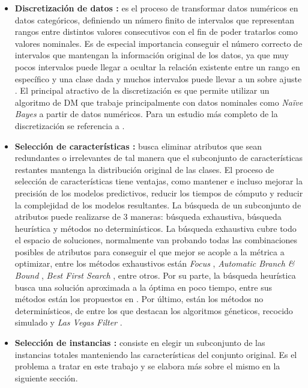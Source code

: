 \begin{itemize}
\item \textbf{Discretización de datos \cite{garcia2016data,garcia2013survey}:}
es el proceso de transformar datos numéricos en datos categóricos, definiendo un número finito de intervalos que representan rangos entre distintos valores consecutivos con el fin de poder tratarlos como valores nominales. Es de especial importancia conseguir el número correcto de intervalos que mantengan la información original de los datos, ya que muy pocos intervalos puede llegar a ocultar la relación existente entre un rango en específico y una clase dada y muchos intervalos puede llevar a un sobre ajuste \cite{cios2007data}. El principal atractivo de la discretización es que permite utilizar un algoritmo de DM que trabaje principalmente con datos nominales como \emph{Naïve Bayes} \cite{yang2009discretization} a partir de datos numéricos. Para un estudio más completo de la discretización se referencia a \cite{garcia2013survey}.

\item \textbf{Selección de características \cite{garcia2016data,liu2012feature}:}
busca eliminar atributos que sean redundantes o irrelevantes de tal manera que el subconjunto de características restantes mantenga la distribución original de las clases. El proceso de selección de características tiene ventajas, como mantener e incluso mejorar la precisión de los modelos predictivos, reducir los tiempos de cómputo y reducir la complejidad de los modelos resultantes. La búsqueda de un subconjunto de atributos puede realizarse de 3 maneras: búsqueda exhaustiva, búsqueda heurística y métodos no determinísticos. La búsqueda exhaustiva cubre todo el espacio de soluciones, normalmente van probando todas las combinaciones posibles de atributos para conseguir el que mejor se acople a la métrica a optimizar, entre los métodos exhaustivos están \emph{Focus} \cite{almuallim1991learning}, \emph{Automatic Branch \& Bound} \cite{liul1998monotonic}, \emph{Best First Search} \cite{xu1988best}, entre otros. Por su parte, la búsqueda heurística busca una solución aproximada a la óptima en poco tiempo, entre sus métodos están los propuestos en \cite{dash1997feature,koller1996toward,battiti1994using}. Por último, están los métodos no determinísticos, de entre los que destacan los algoritmos géneticos, recocido simulado y \emph{Las Vegas Filter} \cite{liu1996probabilistic}.

\item \textbf{Selección de instancias \cite{garcia2016data}:}
consiste en elegir un subconjunto de las instancias totales manteniendo las características del conjunto original. Es el problema a tratar en este trabajo y se elabora más sobre el mismo en la siguiente sección.
\end{itemize}

